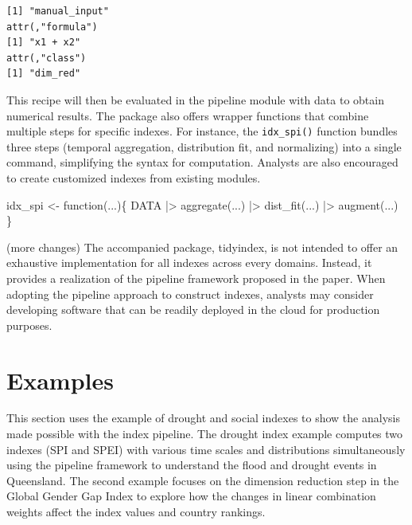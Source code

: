 \documentclass[
]{interact}
\newenvironment{Shaded}{\begin{snugshade}}{\end{snugshade}}
\newcommand{\ControlFlowTok}[1]{\textcolor[rgb]{0.00,0.23,0.31}{#1}}
\newcommand{\FunctionTok}[1]{\textcolor[rgb]{0.28,0.35,0.67}{#1}}
\newcommand{\NormalTok}[1]{\textcolor[rgb]{0.00,0.23,0.31}{#1}}
\newcommand{\OtherTok}[1]{\textcolor[rgb]{0.00,0.23,0.31}{#1}}
\newcommand{\SpecialCharTok}[1]{\textcolor[rgb]{0.37,0.37,0.37}{#1}}
\begin{document}
\begin{verbatim}
[1] "manual_input"
attr(,"formula")
[1] "x1 + x2"
attr(,"class")
[1] "dim_red"
\end{verbatim}

This recipe will then be evaluated in the pipeline module with data to
obtain numerical results. The package also offers wrapper functions that
combine multiple steps for specific indexes. For instance, the
\texttt{idx\_spi()} function bundles three steps (temporal aggregation,
distribution fit, and normalizing) into a single command, simplifying
the syntax for computation. Analysts are also encouraged to create
customized indexes from existing modules.

\begin{Shaded}
\begin{Highlighting}[]
\NormalTok{idx\_spi }\OtherTok{\textless{}{-}} \ControlFlowTok{function}\NormalTok{(...)\{}
\NormalTok{  DATA }\SpecialCharTok{|\textgreater{}} 
    \FunctionTok{aggregate}\NormalTok{(...) }\SpecialCharTok{|\textgreater{}}
    \FunctionTok{dist\_fit}\NormalTok{(...) }\SpecialCharTok{|\textgreater{}} 
    \FunctionTok{augment}\NormalTok{(...)}
\NormalTok{\}}
\end{Highlighting}
\end{Shaded}

(more changes) The accompanied package, tidyindex, is not intended to
offer an exhaustive implementation for all indexes across every domains.
Instead, it provides a realization of the pipeline framework proposed in
the paper. When adopting the pipeline approach to construct indexes,
analysts may consider developing software that can be readily deployed
in the cloud for production purposes.

\hypertarget{sec-examples}{%
\section{Examples}\label{sec-examples}}

This section uses the example of drought and social indexes to show the
analysis made possible with the index pipeline. The drought index
example computes two indexes (SPI and SPEI) with various time scales and
distributions simultaneously using the pipeline framework to understand
the flood and drought events in Queensland. The second example focuses
on the dimension reduction step in the Global Gender Gap Index to
explore how the changes in linear combination weights affect the index
values and country rankings.
\end{document}
